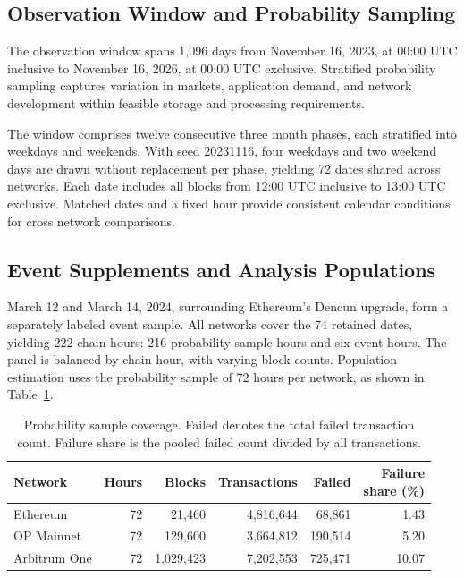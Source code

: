 \documentclass[runningheads]{llncs}
\begin{document}
\subsection{Observation Window and Probability Sampling}
The observation window spans 1,096 days from November 16, 2023, at 00:00 UTC inclusive to November 16, 2026, at 00:00 UTC exclusive. Stratified probability sampling captures variation in markets, application demand, and network development within feasible storage and processing requirements.

The window comprises twelve consecutive three month phases, each stratified into weekdays and weekends. With seed 20231116, four weekdays and two weekend days are drawn without replacement per phase, yielding 72 dates shared across networks. Each date includes all blocks from 12:00 UTC inclusive to 13:00 UTC exclusive. Matched dates and a fixed hour provide consistent calendar conditions for cross network comparisons.

\subsection{Event Supplements and Analysis Populations}
March 12 and March 14, 2024, surrounding Ethereum's Dencun upgrade, form a separately labeled event sample. All networks cover the 74 retained dates, yielding 222 chain hours: 216 probability sample hours and six event hours. The panel is balanced by chain hour, with varying block counts. Population estimation uses the probability sample of 72 hours per network, as shown in Table~\ref{tab:sample}.

\begin{table}[H]
\caption{Probability sample coverage. Failed denotes the total failed transaction count. Failure share is the pooled failed count divided by all transactions.}\label{tab:sample}
\centering\footnotesize
\setlength{\tabcolsep}{2pt}
\begin{tabular*}{\textwidth}{@{\extracolsep{\fill}}lrrrrr@{}}
\toprule Network & Hours & Blocks & Transactions & Failed & \shortstack{Failure\\share (\%)} \\\midrule
Ethereum & 72 & 21,460 & 4,816,644 & 68,861 & 1.43 \\
OP Mainnet & 72 & 129,600 & 3,664,812 & 190,514 & 5.20 \\
Arbitrum One & 72 & 1,029,423 & 7,202,553 & 725,471 & 10.07 \\
\bottomrule
\end{tabular*}
\end{table}
\FloatBarrier
\end{document}
